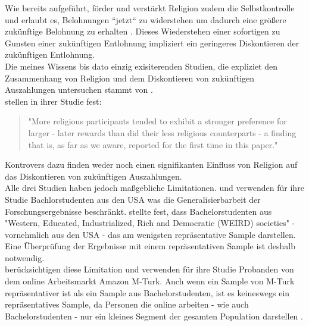 \documentclass[11pt,a4paper]{article}
\begin{document}
Wie bereits aufgeführt, förder und verstärkt Religion zudem die Selbstkontrolle und erlaubt es, Belohnungen “jetzt“ zu widerstehen um dadurch eine größere zukünftige Belohnung zu erhalten \parencite{mccullough2009religion, rounding2012religion, kim2015longitudinal}. Dieses Wiederstehen einer sofortigen  zu Gunsten einer zukünftigen Entlohnung impliziert ein geringeres Diskontieren der zukünftigen Entlohnung.\\


Die meines Wissens bis dato einzig exisiterenden Studien, die expliziet den Zusammenhang von Religion und dem Diskontieren von zukünftigen Auszahlungen untersuchen stammt von \textcite{carter2012religious, thornton2015divine, benjamin2013religious}.\\


\textcite{carter2012religious} stellen in ihrer Studie  fest: 

\begin{quote}
"More religious participants tended to exhibit a stronger preference for larger - later rewards than did their less religious counterparts - a finding that is, as far as we aware, reported for the first time in this paper."
\end{quote} 

Kontrovers dazu finden weder \textcite{thornton2015divine} noch \textcite{benjamin2013religious} einen signifikanten Einfluss von Religion auf das Diskontieren von zukünftigen Auszahlungen.\\
 
Alle drei Studien haben jedoch maßgebliche Limitationen. \textcite{benjamin2013religious} und \textcite{carter2012religious} verwenden für ihre Studie Bachlorstudenten aus den USA was die Generalisierbarbeit der Forschungsergebnisse beschränkt\parencite{carter2012religious}. \textcite{henrich2010weirdest} stellte fest, dass Bachelorstudenten aus "Western, Educated, Industrialized, Rich and Democratic (WEIRD) societies" - vornehmlich aus den USA - das am wenigsten repräsentative Sample darstellen. Eine Überprüfung der Ergebnisse mit einem repräsentativen Sample ist deshalb notwendig.\\
\textcite{thornton2015divine} berücksichtigen diese Limitation und verwenden für ihre Studie Probanden von dem online Arbeitsmarkt Amazon M-Turk. Auch wenn ein Sample von M-Turk  repräsentativer ist als ein Sample aus Bachelorstudenten, ist es keineswegs ein repräsentatives Sample, da Personen die online arbeiten - wie auch Bachelorstudenten - nur ein kleines Segment der gesamten Population darstellen \parencite{horton2011online}.\\
\end{document}
